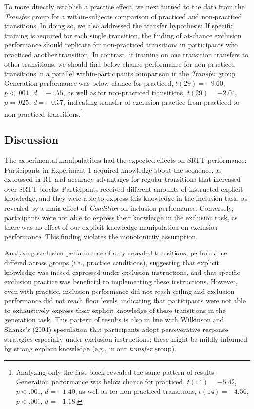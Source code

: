 \documentclass[jou]{apa6}
\theoremstyle{definition}
\theoremstyle{definition}
\theoremstyle{definition}
\theoremstyle{remark}
\begin{document}
To more directly establish a practice effect, we next turned to the data
from the \emph{Transfer} group for a within-subjects comparison of
practiced and non-practiced transitions. In doing so, we also addressed
the transfer hypothesis: If specific training is required for each
single transition, the finding of at-chance exclusion performance should
replicate for non-practiced transitions in participants who practiced
another transition. In contrast, if training on one transition transfers
to other transitions, we should find below-chance performance for
non-practiced transitions in a parallel within-participants comparison
in the \emph{Transfer} group. Generation performance was below chance
for practiced, \(t(29) = -9.60\), \(p < .001\), \(d = -1.75\), as well
as for non-practiced transitions, \(t(29) = -2.04\), \(p = .025\),
\(d = -0.37\), indicating transfer of exclusion practice from practiced
to non-practiced transitions.\footnote{Analyzing only the first block
  revealed the same pattern of results: Generation performance was below
  chance for practiced, \(t(14) = -5.42\), \(p < .001\), \(d = -1.40\),
  as well as for non-practiced transitions, \(t(14) = -4.56\),
  \(p < .001\), \(d = -1.18\).}

\subsection{Discussion}\label{discussion}

The experimental manipulations had the expected effects on SRTT
performance: Participants in Experiment 1 acquired knowledge about the
sequence, as expressed in RT and accuracy advantages for regular
transitions that increased over SRTT blocks. Participants received
different amounts of instructed explicit knowledge, and they were able
to express this knowledge in the inclusion task, as revealed by a main
effect of \emph{Condition} on inclusion performance. Conversely,
participants were not able to express their knowledge in the exclusion
task, as there was no effect of our explicit knowledge manipulation on
exclusion performance. This finding violates the monotonicity
assumption.

Analyzing exclusion performance of only revealed transitions,
performance differed across groups (i.e., practice conditions),
suggesting that explicit knowledge was indeed expressed under exclusion
instructions, and that specific exclusion practice was beneficial to
implementing these instructions. However, even with practice, inclusion
performance did not reach ceiling and exclusion performance did not
reach floor levels, indicating that participants were not able to
exhaustively express their explicit knowledge of these transitions in
the generation task. This pattern of results is also in line with
Wilkinson and Shanks's (2004) speculation that participants adopt
perseverative response strategies especially under exclusion
instructions; these might be mildly informed by strong explicit
knowledge (e.g., in our \emph{transfer} group).
\end{document}
